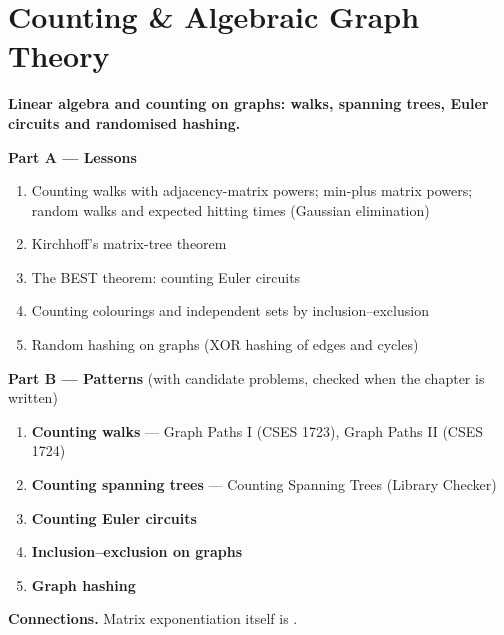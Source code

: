 \chapter{Counting \& Algebraic Graph Theory}
\label{ch:algebraic}

\begin{tcolorbox}[enhanced, colback=white, colframe=secondaryblue, boxrule=1pt, arc=2mm]
\textbf{\large\textcolor{primaryblue}{Linear algebra and counting on graphs: walks, spanning trees, Euler circuits and randomised hashing.}}
\end{tcolorbox}


\begin{plannedbox}
\textbf{Part A --- Lessons}
\begin{enumerate}[leftmargin=*, label=\textbf{A\arabic*.}, itemsep=1pt]
    \item Counting walks with adjacency-matrix powers; min-plus matrix powers; random walks and expected hitting times (Gaussian elimination)
    \item Kirchhoff's matrix-tree theorem
    \item The BEST theorem: counting Euler circuits
    \item Counting colourings and independent sets by inclusion--exclusion
    \item Random hashing on graphs (XOR hashing of edges and cycles)
\end{enumerate}
\textbf{Part B --- Patterns} (with candidate problems, checked when the chapter is written)
\begin{enumerate}[leftmargin=*, label=\textbf{P\arabic*.}, itemsep=1pt]
    \item \textbf{Counting walks} --- Graph Paths I {\small\color{darkgray}(CSES 1723)}, Graph Paths II {\small\color{darkgray}(CSES 1724)}
    \item \textbf{Counting spanning trees} --- Counting Spanning Trees {\small\color{darkgray}(Library Checker)}
    \item \textbf{Counting Euler circuits}
    \item \textbf{Inclusion--exclusion on graphs}
    \item \textbf{Graph hashing}
\end{enumerate}
\textbf{Connections.} Matrix exponentiation itself is .
\end{plannedbox}
